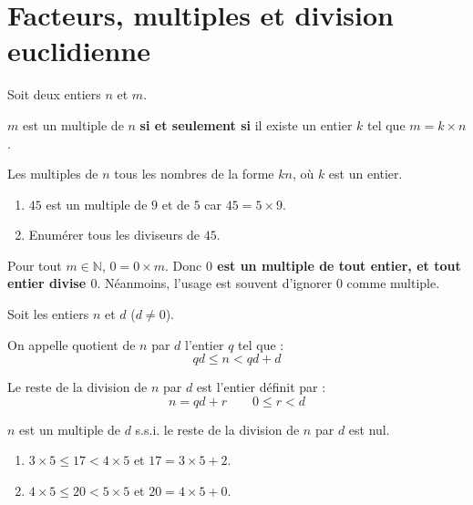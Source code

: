 \documentclass[main.tex]{subfiles}
\begin{document}
\newpage 
{}  
\pagestyle{scrheadings} %
\onehalfspacing
\section{Facteurs, multiples et division euclidienne}
\begin{definition}[Multiples]
	Soit deux entiers $n$ et $m$.
	
	$m$ est un multiple de $n$ \textbf{si et seulement si} il existe un entier $k$ tel que $m=k\times n$.
	
	Les multiples de $n$ tous les nombres de la forme $kn$, où $k$ est un entier.
\end{definition}
\begin{example}\hfill 
	\begin{enumerate}[label={\alph*)}, leftmargin=*]  
		\item $45$ est un multiple de $9$ et de $5$ car $45=5\times 9$.  
		\item Enumérer tous les diviseurs de $45$. 
	\end{enumerate}
\end{example}
\begin{remark}
	Pour tout $m\in \mathbb{N}$,  $0=0\times m$. Donc  \textbf{$0$ est un multiple de tout entier, et tout entier divise $0$}. Néanmoins, l'usage est souvent d'ignorer $0$ comme multiple. 
\end{remark}
\begin{definition} Soit les entiers $n$ et $d$ ($d\neq 0$).
	
	On appelle quotient de $n$ par $d$ l'entier $q$ tel que : 
	\[ qd\leqslant n < qd + d\]
	
	Le reste de la division de $n$ par $d$  est l'entier définit par :
	\[ n = qd + r
	\qquad 0\leqslant r < d \]
	
	$n$ est un multiple de $d$ s.s.i. le reste de la division de $n$
	par $d$ est nul.
\end{definition}
\begin{example} 
	\begin{marginfigure} [-2cm]
		\hfill 
		\caption{$17=3\times 5 + 2$ et $20 = 4 \times 5$}
		\label{chapitre03:figure:divisionentiere}
	\end{marginfigure}
	\begin{enumerate}[label={\alph*)}, leftmargin=*]  
		\item $3\times 5\leqslant 17<4\times 5$ et $17=3\times 5+2$. 
		\item $4\times 5\leqslant 20<5\times 5$ et $20=4\times 5+0$.  
	\end{enumerate} 
\end{example}
\end{document}
